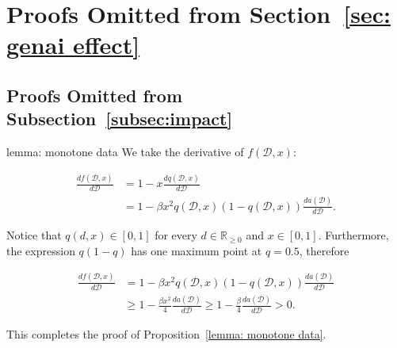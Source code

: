 \section{Proofs Omitted from Section~\ref{sec: genai effect}}
\subsection{Proofs Omitted from Subsection~\ref{subsec:impact}}\label{sec:selective increased}

\begin{proofof}{lemma: monotone data}
We take the derivative of $f(\mathcal{D}, x)$:

\begin{align*}
\frac{df(\mathcal{D}, x)}{d\mathcal{D}} &= 1 - x\frac{dq(\mathcal{D}, x)}{d\mathcal{D}} \\
&= 1 - \beta x^2 q(\mathcal{D}, x)\left(1-q(\mathcal{D},x)\right) \frac{da(\mathcal{D})}{d\mathcal{D}}.
\end{align*}


Notice that $q(d, x) \in [0, 1]$ for every $d \in \mathbb{R}_{\geq 0}$ and $x \in [0, 1]$. Furthermore, the expression $q(1-q)$ has one maximum point at $q = 0.5$, therefore

\begin{align*}
\frac{df(\mathcal{D}, x)}{d\mathcal{D}} &= 1 - \beta x^2 q(\mathcal{D}, x)\left(1-q(\mathcal{D},x)\right) \frac{da(\mathcal{D})}{d\mathcal{D}} \\
&\geq 1- \frac{\beta x^2}{4}\frac{da(\mathcal{D})}{d\mathcal{D}} \geq 1- \frac{\beta}{4}\frac{da(\mathcal{D})}{d\mathcal{D}} > 0.
\end{align*}

This completes the proof of Proposition~\ref{lemma: monotone data}.
\end{proofof}



